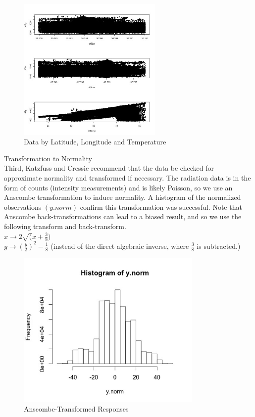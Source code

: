 \documentclass[11pt]{article}
\newcommand{\myindent}{\hspace*{1cm}}
\begin{document}
\begin{figure}[H]
\centering
\includegraphics[width=70mm,keepaspectratio]{Images/detrending_plots.jpg}
\caption{Data by Latitude, Longitude and Temperature \label{fig:2}}
\end{figure}

\underline{Transformation to Normality}\\
Third, Katzfuss and Cressie recommend that the data be checked for approximate normality and transformed if necessary.  The radiation data is in the form of counts (intensity measurements) and is likely Poisson, so we use an Anscombe transformation to induce normality.  A histogram of the normalized observations $(y.norm)$ confirm this transformation was successful.  Note that Anscombe back-transformations can lead to a biased result, and so we use the following transform and back-transform. \\

\myindent $x \rightarrow 2\sqrt(x + \frac{3}{8})$\\
\myindent $y \rightarrow \left(\frac{y}{2}\right)^2 - \frac{1}{8}$ 
\myindent (instead of the direct algebraic inverse, where $\frac{3}{8}$ is subtracted.)

\begin{figure}[H]
\centering
\includegraphics[width=90mm,keepaspectratio]{Images/histogram_ynorm.jpg}
\caption{Anscombe-Transformed Responses \label{fig:3}}
\end{figure}
\end{document}
